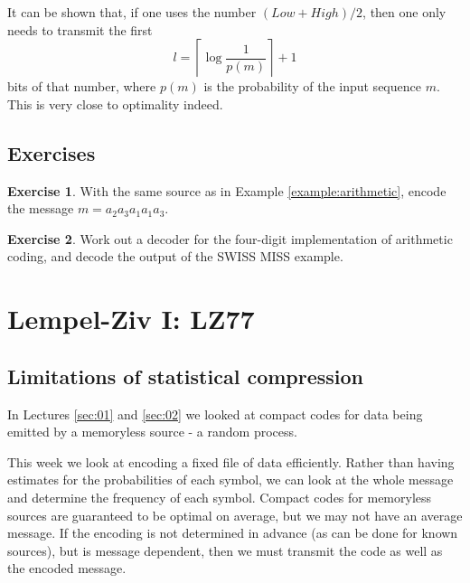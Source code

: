 \documentclass[a4paper, 11pt, openany]{article}
\numberwithin{equation}{section}
\theoremstyle{plain}
\theoremstyle{definition}
\newtheorem{exercise}   {Exercise}  [section]
\begin{document}
It can be shown that, if one uses the number $(Low + High)/2$, then one only needs to transmit the first
\[
    l = \left\lceil \log \frac{1}{p(m)} \right\rceil + 1
\]
bits of that number, where $p(m)$ is the probability of the input sequence $m$. This is very close to optimality indeed.

\subsection{Exercises}

\begin{exercise} \label{exercise:arithmetic}
With the same source as in Example \ref{example:arithmetic}, encode the message $m = a_2a_3a_1a_1a_3$.
\end{exercise}



\begin{exercise} \label{exercise:swiss_miss}
Work out a decoder for the four-digit implementation of arithmetic coding, and decode the output of the SWISS MISS example.
\end{exercise}





\section{Lempel-Ziv I: LZ77}
\label{sec:03}


\subsection{Limitations of statistical compression}

In Lectures \ref{sec:01} and \ref{sec:02} we looked at compact codes for data being emitted by a memoryless source - a random process.

This week we look at encoding a fixed file of data efficiently. Rather than having estimates for the probabilities of each symbol, we can look at the whole message and determine the frequency of each symbol. Compact codes for memoryless sources are guaranteed to be optimal on average, but we may not have an average message. If the encoding is not determined in advance (as can be done for known sources), but is message dependent, then we must transmit the code as well as the encoded message.
\end{document}
